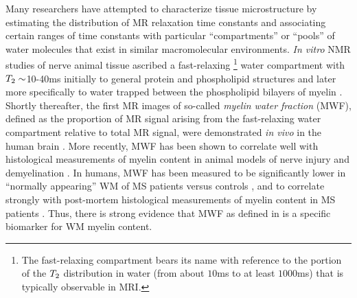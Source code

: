 Many researchers have attempted 
to characterize tissue microstructure
by estimating the distribution
of MR relaxation time constants
and associating certain ranges of time constants
with particular ``compartments'' or ``pools'' of water molecules
that exist in similar macromolecular environments.
\emph{In vitro} NMR studies
of nerve animal tissue
ascribed a fast-relaxing
\footnote{%
	The fast-relaxing compartment bears its name 
	with reference to the portion 
	of the $T_2$ distribution in water
	(from about $10$ms to at least $1000$ms)
	that is typically observable in MRI.
}
water compartment
with $T_2\sim$10-40ms 
initially to general protein 
and phospholipid structures \cite{vasilescu:78:wci}
and later more specifically
to water trapped between
the phospholipid bilayers 
of myelin
\cite{menon:91:aoc, stewart:93:ssr}.
Shortly thereafter,
the first MR images 
of so-called \emph{myelin water fraction} (MWF),
defined as the proportion of MR signal 
arising from the fast-relaxing water compartment
relative to total MR signal,
were demonstrated \emph{in vivo}
in the human brain \cite{mackay:94:ivv}.
More recently,
MWF has been shown 
to correlate well 
with histological measurements
of myelin content 
in animal models
of nerve injury \cite{gareau:00:mta}
and demyelination \cite{webb:03:imt}.
In humans, 
MWF has been measured 
to be significantly lower
in ``normally appearing'' WM 
of MS patients versus controls \cite{laule:04:wca},
and to correlate strongly 
with post-mortem histological measurements
of myelin content
in MS patients \cite{laule:06:mwi}.
Thus,
there is strong evidence
that MWF as defined in \cite{mackay:94:ivv}
is a specific biomarker
for WM myelin content.

